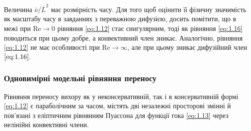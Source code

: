 Величина $\bar \nu / \bar L^2$ має розмірність часу. Для того щоб оцінити її фізичну значимість як масштабу часу в завданнях з переважною дифузією, досить помітити, що в межі при $\text{Re} \to 0$ рівняння \ref{eq:1.12} стає сингулярним, тоді як рівняння \ref{eq:1.16} поводиться при цьому добре, а конвективний член зникає. Аналогічно, рівняння \ref{eq:1.12} не має особливості при $\text{Re} \to \infty$, але при цьому зникає дифузійний член $\ref{eq:1.16}$. 

\subsubsection{Одновимірні модельні рівняння переносу}

Рівняння переносу вихору як у неконсервативній, так і в консервативній формі \ref{eq:1.12} є параболічним за часом, містять дві незалежні просторові змінні й пов'язані з еліптичним рівнянням Пуассона для функції гока \ref{eq:1.13} через нелінійні конвективні члени.

